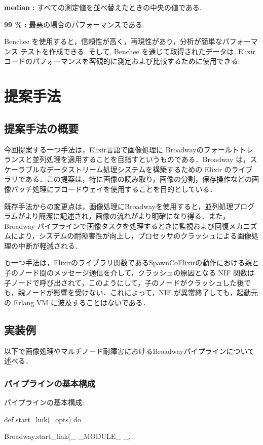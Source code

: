 \documentclass[a4paper]{jreport}	%
\begin{document}
\textbf{median :} すべての測定値を並べ替えたときの中央の値である. 

\textbf{99 \% :} 最悪の場合のパフォーマンスである.

Benchee を使用すると，信頼性が高く，再現性があり，分析が簡単なパフォーマンス テストを作成できる. そして, Benchee を通じて取得されたデータは, Elixir コードのパフォーマンスを客観的に測定および比較するために使用できる.
\chapter{提案手法}
\section{提案手法の概要}
今回提案する一つ手法は，Elixir言語で画像処理に Broadwayのフォールトトレランスと並列処理を適用することを目指すというものである．Broadway は，スケーラブルなデータストリーム処理システムを構築するための Elixir のライブラリである．この提案は，特に画像の読み取り，画像の分割，保存操作などの画像バッチ処理にブロードウェイを使用することを目的としている． 

既存手法からの変更点は，画像処理にBroadwayを使用すると，並列処理プログラムがより簡潔に記述され，画像の流れがより明確になり得る．また，Broadway パイプラインで画像タスクを処理するときに監視および回復メカニズムにより，システムの耐障害性が向上し，プロセッサのクラッシュによる画像処理の中断が軽減される．

も一つ手法は，Elixirのライブラリ関数であるSpawnCoElixirの動作における親と子のノード間のメッセージ通信を介して，クラッシュの原因となる NIF 関数は子ノードで呼び出されて，このようにして，子のノードがクラッシュした後でも，親ノードが影響を受けない．これによって，NIF が異常終了しても，起動元の Erlang VM に波及することはないである．

\section{実装例}
以下で画像処理やマルチノード耐障害におけるBroadwayパイプラインについて述べる．
\subsection{パイプラインの基本構成}
パイプラインの基本構成:

def start\_link(\_opts) do

    Broadway.start\_link(\_ \_MODULE\_ \_,
    
\end{document}
